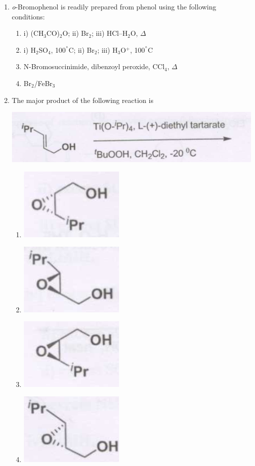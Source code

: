 \documentclass[12pt]{article}
\begin{document}
\begin{enumerate}
\item \textit{o}-Bromophenol is readily prepared from phenol using the following conditions:
\begin{enumerate}
\item i) (CH$_3$CO)$_2$O;  ii) Br$_2$;  iii) HCl–H$_2$O, $\Delta$
\item i) H$_2$SO$_4$, 100$^\degree$C;  ii) Br$_2$;  iii) H$_3$O$^+$, 100$^\degree$C
\item N-Bromosuccinimide, dibenzoyl peroxide, CCl$_4$, $\Delta$
\item Br$_2$/FeBr$_3$    \hfill{}
\end{enumerate}


\item The major product of the following reaction is

\begin{center}
\includegraphics[width=0.6\columnwidth]{figs/q42.png}
\end{center}    \hfill{}
\begin{enumerate}
    \item \includegraphics[width=0.2\columnwidth]{figs/q42 a.png} 
    \item \includegraphics[width=0.2\columnwidth]{figs/q42 b.png} 
    \item \includegraphics[width=0.2\columnwidth]{figs/q42 c.png} 
    \item \includegraphics[width=0.2\columnwidth]{figs/q42 d.png} 
\end{enumerate}


\end{enumerate}
\end{document}
